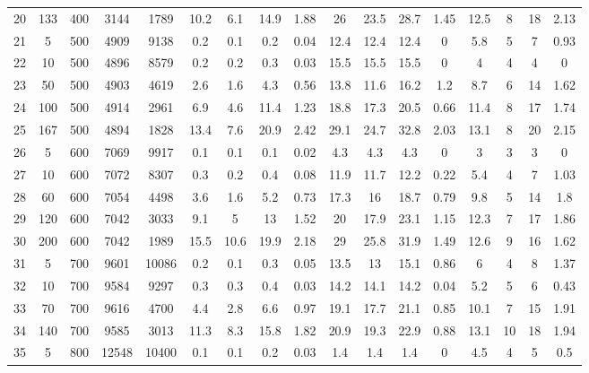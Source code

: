 \documentclass[11pt]{article}
\newcommand{\np}{\newpage}
\begin{document}
\begin{appendices}
\begin{landscape}
\begin{longtable}[c]{ccccc|cccc|cccc|cccc}
				20 & 133 & 400 & 3144 & 1789 & 10.2 & 6.1 & 14.9 & 1.88 & 26 & 23.5 & 28.7 & 1.45 & 12.5 & 8 & 18 & 2.13 \\ \np
				\rowcolor[HTML]{EFEFEF} 
				21 & 5 & 500 & 4909 & 9138 & 0.2 & 0.1 & 0.2 & 0.04 & 12.4 & 12.4 & 12.4 & 0 & 5.8 & 5 & 7 & 0.93 \\
				\rowcolor[HTML]{EFEFEF} 
				22 & 10 & 500 & 4896 & 8579 & 0.2 & 0.2 & 0.3 & 0.03 & 15.5 & 15.5 & 15.5 & 0 & 4 & 4 & 4 & 0 \\
				\rowcolor[HTML]{EFEFEF} 
				23 & 50 & 500 & 4903 & 4619 & 2.6 & 1.6 & 4.3 & 0.56 & 13.8 & 11.6 & 16.2 & 1.2 & 8.7 & 6 & 14 & 1.62 \\
				\rowcolor[HTML]{EFEFEF} 
				24 & 100 & 500 & 4914 & 2961 & 6.9 & 4.6 & 11.4 & 1.23 & 18.8 & 17.3 & 20.5 & 0.66 & 11.4 & 8 & 17 & 1.74 \\
				\rowcolor[HTML]{EFEFEF} 
				25 & 167 & 500 & 4894 & 1828 & 13.4 & 7.6 & 20.9 & 2.42 & 29.1 & 24.7 & 32.8 & 2.03 & 13.1 & 8 & 20 & 2.15 \\
				26 & 5 & 600 & 7069 & 9917 & 0.1 & 0.1 & 0.1 & 0.02 & 4.3 & 4.3 & 4.3 & 0 & 3 & 3 & 3 & 0 \\
				27 & 10 & 600 & 7072 & 8307 & 0.3 & 0.2 & 0.4 & 0.08 & 11.9 & 11.7 & 12.2 & 0.22 & 5.4 & 4 & 7 & 1.03 \\
				28 & 60 & 600 & 7054 & 4498 & 3.6 & 1.6 & 5.2 & 0.73 & 17.3 & 16 & 18.7 & 0.79 & 9.8 & 5 & 14 & 1.8 \\
				29 & 120 & 600 & 7042 & 3033 & 9.1 & 5 & 13 & 1.52 & 20 & 17.9 & 23.1 & 1.15 & 12.3 & 7 & 17 & 1.86 \\
				30 & 200 & 600 & 7042 & 1989 & 15.5 & 10.6 & 19.9 & 2.18 & 29 & 25.8 & 31.9 & 1.49 & 12.6 & 9 & 16 & 1.62 \\
				\rowcolor[HTML]{EFEFEF} 
				31 & 5 & 700 & 9601 & 10086 & 0.2 & 0.1 & 0.3 & 0.05 & 13.5 & 13 & 15.1 & 0.86 & 6 & 4 & 8 & 1.37 \\
				\rowcolor[HTML]{EFEFEF} 
				32 & 10 & 700 & 9584 & 9297 & 0.3 & 0.3 & 0.4 & 0.03 & 14.2 & 14.1 & 14.2 & 0.04 & 5.2 & 5 & 6 & 0.43 \\
				\rowcolor[HTML]{EFEFEF} 
				33 & 70 & 700 & 9616 & 4700 & 4.4 & 2.8 & 6.6 & 0.97 & 19.1 & 17.7 & 21.1 & 0.85 & 10.1 & 7 & 15 & 1.91 \\
				\rowcolor[HTML]{EFEFEF} 
				34 & 140 & 700 & 9585 & 3013 & 11.3 & 8.3 & 15.8 & 1.82 & 20.9 & 19.3 & 22.9 & 0.88 & 13.1 & 10 & 18 & 1.94 \\
				35 & 5 & 800 & 12548 & 10400 & 0.1 & 0.1 & 0.2 & 0.03 & 1.4 & 1.4 & 1.4 & 0 & 4.5 & 4 & 5 & 0.5 \\

\end{longtable}
\end{landscape}
\end{appendices}
\end{document}
